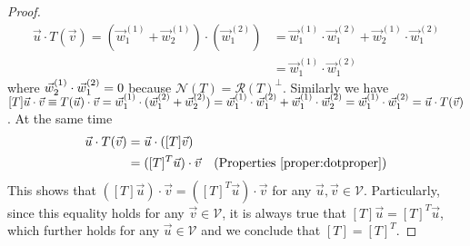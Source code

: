 \begin{proof}
\begin{align*}
\vec{u} \cdot T(\vec{v}) = (\vec{w}_1^{(1)} + \vec{w}_2^{(1)}) \cdot (\vec{w}_1^{(2)}) &= \vec{w}_1^{(1)} \cdot \vec{w}_1^{(2)} + \vec{w}_2^{(1)} \cdot \vec{w}_1^{(2)} \\
&= \vec{w}_1^{(1)} \cdot \vec{w}_1^{(2)}
\end{align*}
where $\smash{\vec{w}_2^{(1)}} \cdot \smash{\vec{w}_1^{(2)}} = 0$ because $\mathcal{N}(T) = \mathcal{R}(T)^\perp$. Similarly we have $[T]\vec{u} \cdot \vec{v} \equiv T(\vec{u}) \cdot \vec{v} = \smash{\vec{w}_1^{(1)}} \cdot (\smash{\vec{w}_1^{(2)} + \vec{w}_2^{(2)}}) = \smash{\vec{w}_1^{(1)} \cdot \vec{w}_1^{(2)}} + \smash{\vec{w}_1^{(1)} \cdot \vec{w}_2^{(2)}} = \smash{\vec{w}_1^{(1)} \cdot \vec{w}_1^{(2)} = \vec{u} \cdot T(\vec{v})}$. At the same time
\begin{align*}
\vec{u} \cdot T(\vec{v}) &= \vec{u} \cdot ([T]\vec{v}) \\
&= ([T]^T\vec{u}) \cdot \vec{v} & \text{(Properties \ref{proper:dotproper})}
\end{align*}
This shows that $([T]\vec{u}) \cdot \vec{v} = ([T]^T\vec{u}) \cdot \vec{v}$ for any $\vec{u}, \vec{v} \in \mathcal{V}$. Particularly, since this equality holds for any $\vec{v} \in \mathcal{V}$, it is always true that $[T]\vec{u} = [T]^T\vec{u}$, which further holds for any $\vec{u} \in \mathcal{V}$ and we conclude that $[T] = [T]^T$.
\end{proof}

